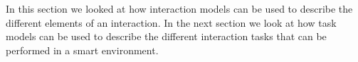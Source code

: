 In this section we looked at how interaction models can be used to describe the different elements of an interaction. In the next section we look at how task models can be used to describe the different interaction tasks that can be performed in a smart environment.

% 
% 
% 
% 
% 
% 
% 
% 
% 
% 
% 
% 
